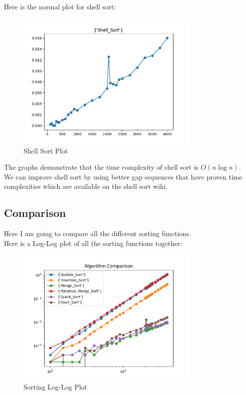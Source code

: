 \documentclass{article}
\begin{document}
Here is the normal plot for shell sort:
\begin{figure}[H]
    \centering
    \includegraphics*[width=0.8\textwidth]{img/plot_Shell_Sort.png}
    \caption{Shell Sort Plot}
\end{figure}

The graphs demonstrate that the time complexity of shell sort is $O(n \log n)$. \\

We can improve shell sort by using better gap sequences that have proven time complexities which are available on the shell sort wiki.

\vspace{\baselineskip}
\subsection{Comparison}
Here I am going to compare all the different sorting functions. \\
Here is a Log-Log plot of all the sorting functions together:
\begin{figure}[H]
    \centering
    \includegraphics*[width=0.8\textwidth]{img/loglog_combined.png}
    \caption{Sorting Log-Log Plot}
\end{figure}
\end{document}
